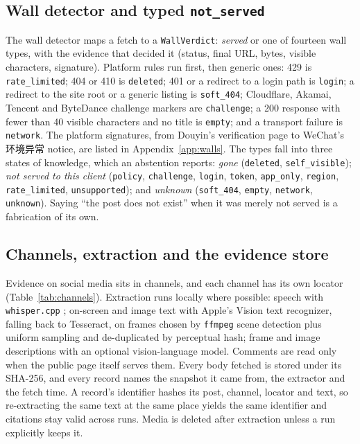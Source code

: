 \documentclass[11pt]{article}
\newcommand{\zh}[1]{#1}
\DeclareRobustCommand{\zh}[1]{\begin{CJK}{UTF8}{gbsn}#1\end{CJK}}
\newcommand{\wt}[1]{\texttt{#1}}%
\begin{document}
\subsection{Wall detector and typed \texttt{not\_served}}
The wall detector maps a fetch to a \texttt{WallVerdict}: \emph{served} or one of fourteen wall types, with
the evidence that decided it (status, final URL, bytes, visible characters, signature). Platform rules run
first, then generic ones: 429 is \wt{rate\_limited}; 404 or 410 is \wt{deleted}; 401 or a redirect to a login
path is \wt{login}; a redirect to the site root or a generic listing is \wt{soft\_404}; Cloudflare, Akamai,
Tencent and ByteDance challenge markers are \wt{challenge}; a 200 response with fewer than 40 visible
characters and no title is \wt{empty}; and a transport failure is \wt{network}. The platform signatures,
from Douyin's verification page to WeChat's \zh{环境异常} notice, are listed in
Appendix~\ref{app:walls}. The types fall into three states of knowledge, which an abstention reports:
\emph{gone} (\wt{deleted}, \wt{self\_visible}); \emph{not served to this client} (\wt{policy},
\wt{challenge}, \wt{login}, \wt{token}, \wt{app\_only}, \wt{region}, \wt{rate\_limited}, \wt{unsupported});
and \emph{unknown} (\wt{soft\_404}, \wt{empty}, \wt{network}, \wt{unknown}). Saying ``the post does not
exist'' when it was merely not served is a fabrication of its own.

\subsection{Channels, extraction and the evidence store}
Evidence on social media sits in channels, and each channel has its own locator (Table~\ref{tab:channels}).
Extraction runs locally where possible: speech with \texttt{whisper.cpp} \citep{radford2022whisper}; on-screen
and image text with Apple's Vision text recognizer, falling back to Tesseract, on frames chosen by
\texttt{ffmpeg} scene detection plus uniform sampling and de-duplicated by perceptual hash; frame and image
descriptions with an optional vision-language model. Comments are read only when the public page itself
serves them. Every body fetched is stored under its SHA-256, and every record names the snapshot it came
from, the extractor and the fetch time. A record's identifier hashes its post, channel, locator and text, so
re-extracting the same text at the same place yields the same identifier and citations stay valid across
runs. Media is deleted after extraction unless a run explicitly keeps it.
\end{document}
